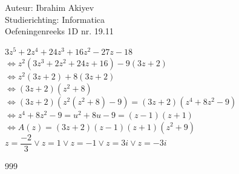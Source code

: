 \documentclass[a4paper]{article}
\begin{document}
\noindent \large Auteur: Ibrahim Akiyev \\
\noindent \large Studierichting: Informatica\\
\noindent \large Oefeningenreeks 1D nr. 19.11\\

\medskip

\normalsize

$3z^5 + 2z^4  +24z^3 + 16z^2 -27z -18 $\\

$\Leftrightarrow z^2 (3z^3 + 2z^2 + 24z +16) - 9 (3z + 2)$\\

$\Leftrightarrow z^2 (3z + 2) + 8 (3z + 2)$\\

$\Leftrightarrow (3z + 2)(z^2 +8)$\\

$\Leftrightarrow (3z + 2)(z^2 (z^2 + 8) -9) = (3z +2)(z^4 + 8z^2 -9)$\\

$\Leftrightarrow z^4 + 8z^2 -9 = u^2 + 8u -9 = (z - 1)(z + 1)$\\

$\Leftrightarrow A(z) = (3z + 2)(z - 1)(z + 1)(z^2 + 9)$\\

$z = \dfrac{-2}{3} \vee z = 1 \vee z = -1 \vee z = 3i \vee z = -3i$
\begin{thebibliography}{999}
\end{thebibliography}
\end{document}
